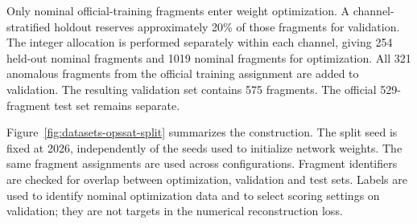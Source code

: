 Only nominal official-training fragments enter weight optimization. A
channel-stratified holdout reserves approximately \num{20}\% of those
fragments for validation. The integer allocation is performed separately
within each channel, giving \num{254} held-out nominal fragments and
\num{1019} nominal fragments for optimization. All \num{321} anomalous
fragments from the official training assignment are added to validation.
The resulting validation set contains \num{575} fragments. The official
\num{529}-fragment test set remains separate.

Figure~\ref{fig:datasets-opssat-split} summarizes the construction. The split
seed is fixed at \num{2026}, independently of the seeds used to initialize
network weights. The same fragment assignments are used across configurations.
Fragment identifiers are checked for overlap between optimization, validation
and test sets. Labels are used to identify nominal optimization data and to
select scoring settings on validation; they are not targets in the numerical
reconstruction loss.

